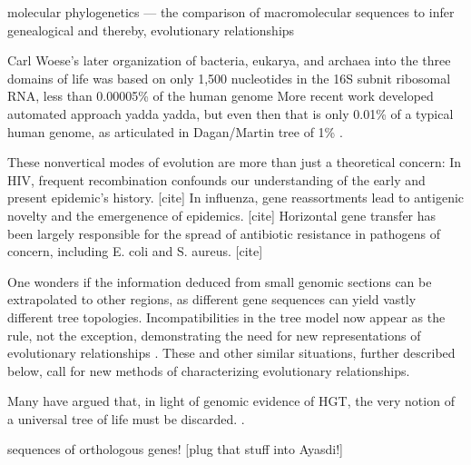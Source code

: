 
molecular phylogenetics — the comparison of macromolecular sequences to infer genealogical and thereby, evolutionary relationships

Carl Woese's later organization of bacteria, eukarya, and archaea into the three domains of life was based on only 1,500 nucleotides in the 16S subnit ribosomal RNA, less than 0.00005\% of the human genome \cite{Woese:1977vd}
More recent work developed automated approach yadda yadda\cite{Ciccarelli:2006gw}, but even then that is only 0.01\% of a typical human genome, as articulated in Dagan/Martin tree of 1\% \cite{Dagan:2006}.

These nonvertical modes of evolution are more than just a theoretical concern:
In HIV, frequent recombination confounds our understanding of the early and present epidemic’s history. [cite]
In influenza, gene reassortments lead to antigenic novelty and the emergenence of epidemics. [cite]
Horizontal gene transfer has been largely responsible for the spread of antibiotic resistance in pathogens of concern, including E. coli and S. aureus. [cite]

One wonders if the information deduced from small genomic sections can be extrapolated to other regions, as different gene sequences can yield vastly different tree topologies.
Incompatibilities in the tree model now appear as the rule, not the exception, demonstrating the need for new representations of evolutionary relationships \autocite{Doolittle:1999,Doolittle:2006}.
These and other similar situations, further described below, call for new methods of characterizing evolutionary relationships.

Many have argued that, in light of genomic evidence of HGT, the very notion of a universal tree of life must be discarded. .

sequences of orthologous genes! [plug that stuff into Ayasdi!]

